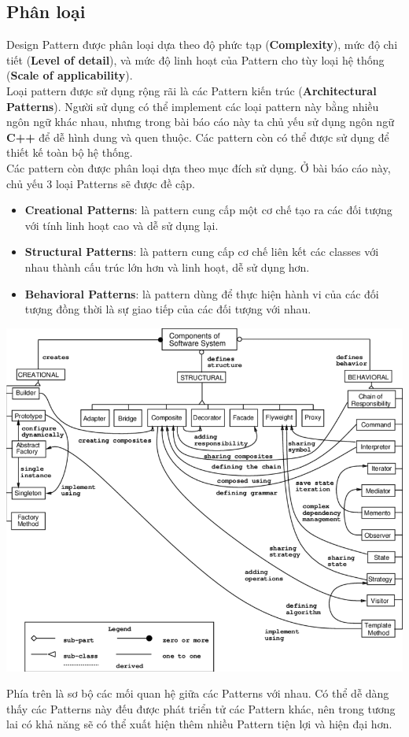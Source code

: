\subsection{Phân loại}
Design Pattern được phân loại dựa theo độ phức tạp (\textbf{Complexity}), mức độ chi tiết (\textbf{Level of detail}), và mức độ linh hoạt của Pattern cho tùy loại hệ thống (\textbf{Scale of applicability}).\\
Loại pattern được sử dụng rộng rãi là các Pattern kiến trúc (\textbf{Architectural Patterns}). Người sử dụng có thể implement các loại pattern này bằng nhiều ngôn ngữ khác nhau, nhưng trong bài báo cáo này ta chủ yếu sử dụng ngôn ngữ \textbf{C++} để dễ hình dung và quen thuộc. Các pattern còn có thể được sử dụng để thiết kế toàn bộ hệ thống.\\
Các pattern còn được phân loại dựa theo mục đích sử dụng. Ở bài báo cáo này, chủ yếu 3 loại Patterns sẽ được đề cập.\\
\begin{itemize}
    \item \textbf{Creational Patterns}: là pattern cung cấp một cơ chế tạo ra các đối tượng với tính linh hoạt cao và dễ sử dụng lại.
    \item \textbf{Structural Patterns}: là pattern cung cấp cơ chế liên kết các classes với nhau thành cấu trúc lớn hơn và linh hoạt, dễ sử dụng hơn.
    \item \textbf{Behavioral Patterns}: là pattern dùng để thực hiện hành vi của các đối tượng đồng thời là sự giao tiếp của các đối tượng với nhau.
\end{itemize}
\begin{center}
  \includegraphics[scale=0.5]{image/dp3.png}  
\end{center}
Phía trên là sơ bộ các mối quan hệ giữa các Patterns với nhau. Có thể dễ dàng thấy các Patterns này đếu được phát triển tử các Pattern khác, nên trong tương lai có khả năng sẽ có thể xuất hiện thêm nhiều Pattern tiện lợi và hiện đại hơn.
